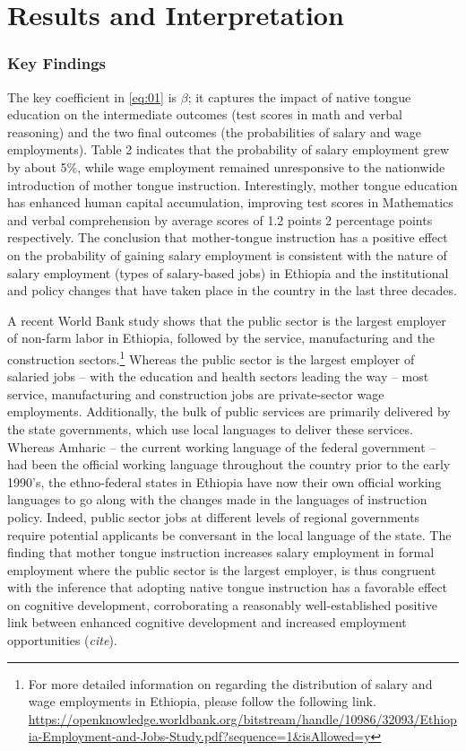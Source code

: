 
\section{Results and Interpretation}

\subsubsection*{Key Findings}

The key coefficient in \eqref{eq:01} is $ \beta $; it captures the impact of native tongue education on the intermediate outcomes (test scores in math and verbal reasoning) and the two final outcomes (the probabilities of salary and wage employments). Table 2 indicates that the probability of salary employment grew by about 5\%, while wage employment remained unresponsive to the nationwide introduction of mother tongue instruction. Interestingly, mother tongue education has enhanced human capital accumulation, improving test scores in Mathematics and verbal comprehension by average scores of 1.2 points 2 percentage points respectively. The conclusion that mother-tongue instruction has a positive effect on the probability of gaining salary employment is consistent with the nature of salary employment (types of salary-based jobs) in Ethiopia and the institutional and policy changes that have taken place in the country in the last three decades.  

A recent World Bank study shows that the public sector is the largest employer of non-farm labor in Ethiopia, followed by the service, manufacturing and the construction sectors.\footnote{For more detailed information on regarding the distribution of salary and wage employments in Ethiopia, please follow the following link.  \url{https://openknowledge.worldbank.org/bitstream/handle/10986/32093/Ethiopia-Employment-and-Jobs-Study.pdf?sequence=1&isAllowed=y}} Whereas the public sector is the largest employer of salaried jobs – with the education and health sectors leading the way – most service, manufacturing and construction jobs are private-sector wage employments.  Additionally, the bulk of public services are primarily delivered by the state governments, which use local languages to deliver these services. Whereas Amharic – the current working language of the federal government – had been the official working language throughout the country prior to the early 1990’s, the ethno-federal states in Ethiopia have now their own official working languages to go along with the changes made in the languages of instruction policy.  Indeed, public sector jobs at different levels of regional governments require potential applicants be conversant in the local language of the state. The finding that mother tongue instruction increases salary employment in formal employment where the public sector is the largest employer, is thus congruent with the inference that adopting native tongue instruction has a favorable effect on cognitive development, corroborating a reasonably well-established positive link between enhanced cognitive development and increased employment opportunities (\textit{cite}).

